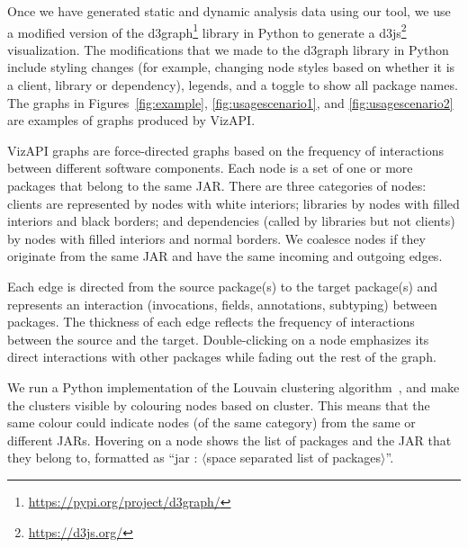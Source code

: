 Once we have generated static and dynamic analysis data using our tool, we use a modified version
of the d3graph\footnote{\url{https://pypi.org/project/d3graph/}} library in Python to generate a d3js\footnote{\url{https://d3js.org/}}
visualization. The modifications that we made to the d3graph  library in Python include styling changes (for example, changing node styles based on whether it is a client, library or dependency),
legends, and a toggle to show all package names. 
The graphs in Figures~\ref{fig:example}, \ref{fig:usagescenario1}, and \ref{fig:usagescenario2} are examples of graphs produced by VizAPI.

VizAPI graphs are force-directed graphs based on the frequency of
interactions between different software components.  Each node is a
set of one or more packages that belong to the same JAR.  There are
three categories of nodes: clients are represented by nodes with white
interiors; libraries by nodes with filled interiors and black borders;
and dependencies (called by libraries but not clients) by nodes with
filled interiors and normal borders.  We coalesce nodes if they
originate from the same JAR and have the same incoming and
outgoing edges.

Each edge is directed
from the source package(s) to the target package(s) and represents an interaction 
(invocations, fields, annotations, subtyping) between packages. 
The thickness of each edge reflects the frequency of interactions between the source and the target.
Double-clicking on a node emphasizes its direct interactions with other packages while fading out the rest of the graph.


We run a Python implementation of the Louvain clustering algorithm~\cite{blondel2008fast}, and make the clusters 
visible by colouring nodes based on cluster.
This means that the same colour could indicate nodes (of the same category) from the same or different JARs.
Hovering on a node shows the list of packages and 
the JAR that they belong to, 
formatted as “jar : $\langle$space separated list of packages$\rangle$”. 
